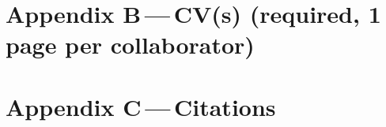 \documentclass[11pt,a4paper]{article}
\begin{document}
\section*{Appendix B\,---\,CV(s) (required, 1 page per collaborator)}


\section*{Appendix C\,---\,Citations}

\end{document}
